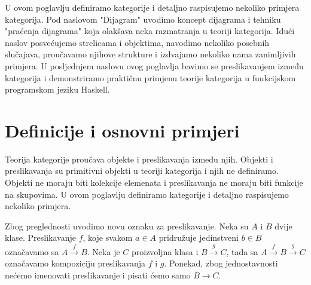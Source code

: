   U ovom poglavlju definiramo kategorije i detaljno raspisujemo nekoliko
  primjera kategorija. 
  Pod naslovom "Dijagram" uvodimo koncept dijagrama i tehniku "praćenja
  dijagrama" koja olakšava neka razmatranja u teoriji kategorija.
  Idući naslov posvećujemo  strelicama i objektima, navodimo nekoliko
  posebnih slučajava, proučavamo njihove strukture i izdvajamo nekoliko nama zanimljivih primjera.
  U posljednjem naslovu ovog poglavlja bavimo se preslikavanjem između kategorija i
  demonstriramo praktičnu primjenu teorije kategorija u funkcijskom programskom jeziku Haskell.

  \section{Definicije i osnovni primjeri}
  Teorija kategorije proučava objekte i preslikavanja između
  njih. Objekti i preslikavanja su primitivni objekti u teoriji kategorija i
  njih ne definiramo. Objekti ne moraju biti kolekcije elemenata i
  preslikavanja ne moraju biti funkcije na skupovima.
  U ovom poglavlju definiramo kategorije i detaljno raspisujemo nekoliko
  primjera.

  Zbog preglednosti uvodimo novu oznaku za preslikavanje.
  Neka su $A$ i $B$ dvije klase. Preslikavanje $f$, koje svakom $a \in A$ pridružuje jedinstveni $b \in B$ označavamo
  sa $A \xrightarrow{f} B$. Neka je $C$ proizvoljna klasa i $B \xrightarrow{g} C$, tada sa $A \xrightarrow{f} B \xrightarrow{g} C$
  označavamo kompoziciju preslikavanja $f$ i $g$. Ponekad, zbog jednostavnosti nećemo imenovati preslikavanje i pisati ćemo samo $B \xrightarrow{} C$.

